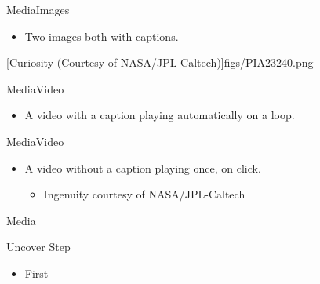 \documentclass[aspectratio=169,12pt]{beamer}%
\begin{document}
    \begin{frame}{Media}{Images}
        \tworowbigbottom%
        {%
            \begin{itemize}
                \item Two images both with captions.
            \end{itemize}
        }%
        {%
            [Curiosity (Courtesy of NASA/JPL-Caltech)]{figs/PIA23240.png}
        }%
    \end{frame}
    \begin{frame}
    \end{frame}


    \begin{frame}{Media}{Video}
        \twocolumnbigright%
        {%
            \begin{itemize}
                \item A video with a caption playing automatically on a loop.
            \end{itemize}
        }%
        {%
        }%
    \end{frame}
    \begin{frame}{Media}{Video}
        \twocolumnbigright%
        {%
            \begin{itemize}
                \item A video without a caption playing once, on click.
                \begin{itemize}
                    \item Ingenuity courtesy of NASA/JPL-Caltech
                \end{itemize}
            \end{itemize}
        }%
        {%
        }%
    \end{frame}
    \begin{frame}{Media}
    \end{frame}



    \begin{frame}{Uncover Step}
        \onecolumnfull%
        {%
            \begin{itemize}%
                \item First
            \end{itemize}%
        }%
    \end{frame}
\end{document}

